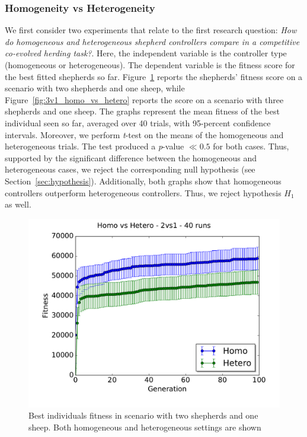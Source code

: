 \documentclass[conference]{IEEEtran}
\begin{document}
\subsubsection{Homogeneity vs Heterogeneity}
We first consider two experiments that relate to the first research question: \textit{How do homogeneous and heterogeneous shepherd controllers compare in a competitive co-evolved herding task?}. 
Here, the independent variable is the controller type (homogeneous or heterogeneous). The dependent variable is the fitness score for the best fitted shepherds so far. 
Figure~\ref{fig:2v1_homo_vs_hetero} reports the shepherds' fitness score on a scenario with two shepherds and one sheep, while Figure~\ref{fig:3v1_homo_vs_hetero} reports the score on a scenario with three shepherds and one sheep.
The graphs represent the mean fitness of the best individual seen so far, averaged over 40 trials, with 95-percent confidence intervals.
Moreover, we perform \textit{t}-test on the means of the homogeneous and heterogeneous trials. The test  produced a \textit{p}-value $\ll0.5$ for both cases.
Thus, supported by the significant difference between the homogeneous and heterogeneous cases, we reject the corresponding null hypothesis (see Section~\ref{sec:hypothesis}).
Additionally, both graphs show that homogeneous controllers outperform heterogeneous controllers. Thus, we reject hypothesis $H_1$ as well.

\begin{figure}[ht]
	\centering
	\includegraphics[width=1\hsize]{imgs/homo2v1-hetero2v1-bestSoFar.pdf}
	\caption{Best individuals fitness in scenario with two shepherds and one sheep. Both homogeneous and heterogeneous settings are shown}
	\label{fig:2v1_homo_vs_hetero}
\end{figure}
\end{document}
